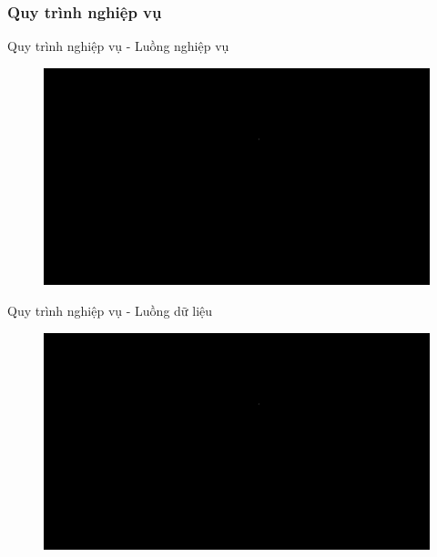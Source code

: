 \documentclass{beamer}
\begin{document}
\subsubsection{Quy trình nghiệp vụ}

\begin{frame}{Quy trình nghiệp vụ - Luồng nghiệp vụ}
\begin{figure}[H]
\centering
\includegraphics[scale = 0.3]{pictures/black.png}
\end{figure}
\end{frame}
\begin{frame}{Quy trình nghiệp vụ - Luồng dữ liệu}
\begin{figure}[H]
\centering
\includegraphics[scale = 0.3]{pictures/black.png}
\end{figure}
\end{frame}
\end{document}
